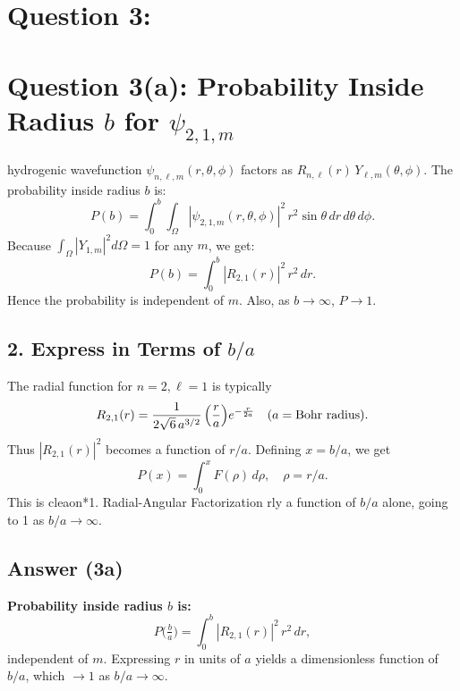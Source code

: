 \documentclass[12pt]{article}
\begin{document}
\section*{Question 3:}
\section*{Question 3(a): Probability Inside Radius $b$ for $\psi_{2,1,m}$}

\subsectiThe hydrogenic wavefunction $\psi_{n,\ell,m}(r,\theta,\phi)$ factors as $R_{n,\ell}(r)\,Y_{\ell,m}(\theta,\phi)$. The probability inside radius $b$ is:
\begin{equation}
P(b) = \int_0^b \int_{\Omega} |\psi_{2,1,m}(r,\theta,\phi)|^2\,r^2\sin\theta\,dr\,d\theta\,d\phi.
\end{equation}
Because $\int_{\Omega} |Y_{1,m}|^2 d\Omega = 1$ for any $m$, we get:
\begin{equation}
P(b) = \int_0^b |R_{2,1}(r)|^2\,r^2\,dr.
\end{equation}
Hence the probability is independent of $m$. Also, as $b\to\infty$, $P\to1$.

\subsection*{2. Express in Terms of $b/a$}
The radial function for $n=2,\ell=1$ is typically
\begin{equation}
R_{2,1}(r) = \frac{1}{2\sqrt{6}\,a^{3/2}}\,\Bigl(\frac{r}{a}\Bigr) e^{-\frac{r}{2a}} \quad (a=\text{Bohr radius}).
\end{equation}
Thus $|R_{2,1}(r)|^2$ becomes a function of $r/a$. Defining $x=b/a$, we get
\begin{equation}
P(x) = \int_0^x F(\rho)\,d\rho,\quad \rho = r/a.
\end{equation}
This is cleaon*{1. Radial-Angular Factorization}
rly a function of $b/a$ alone, going to 1 as $b/a\to\infty$.

\subsection*{Answer (3a)}
\textbf{Probability inside radius $b$ is:}
\begin{equation}
P\bigl(\tfrac{b}{a}\bigr) = \int_0^{b} |R_{2,1}(r)|^2\,r^2\,dr,
\end{equation}
independent of $m$. Expressing $r$ in units of $a$ yields a dimensionless function of $b/a$, which $\to1$ as $b/a\to\infty$.
\end{document}
